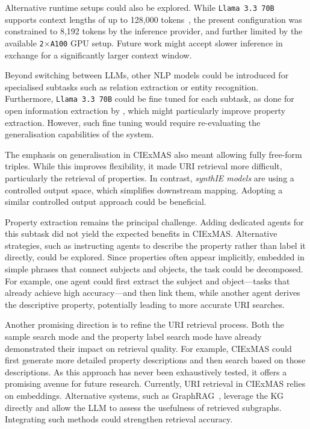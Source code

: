 \documentclass[a4paper,oneside,bibliography=totoc]{scrbook}
\begin{document}
Alternative runtime setups could also be explored. While \texttt{Llama 3.3 70B} supports context lengths of up to 128{,}000 tokens~\cite{Meta2024}, the present configuration was constrained to 8{,}192 tokens by the inference provider, and further limited by the available \texttt{2$\times$A100} GPU setup. Future work might accept slower inference in exchange for a significantly larger context window.

Beyond switching between \acp{LLM}, other \ac{NLP} models could be introduced for specialised subtasks such as relation extraction or entity recognition. Furthermore, \texttt{Llama 3.3 70B} could be fine tuned for each subtask, as done for open information extraction by \citet{Xue2024}, which might particularly improve property extraction. However, such fine tuning would require re-evaluating the generalisation capabilities of the system.

The emphasis on generalisation in CIExMAS also meant allowing fully free-form triples. While this improves flexibility, it made \ac{URI} retrieval more difficult, particularly the retrieval of properties. In contrast, \textit{synthIE models} are using a controlled output space, which simplifies downstream mapping. Adopting a similar controlled output approach could be beneficial.

Property extraction remains the principal challenge. Adding dedicated agents for this subtask did not yield the expected benefits in CIExMAS. Alternative strategies, such as instructing agents to describe the property rather than label it directly, could be explored. Since properties often appear implicitly, embedded in simple phrases that connect subjects and objects, the task could be decomposed. For example, one agent could first extract the subject and object—tasks that already achieve high accuracy—and then link them, while another agent derives the descriptive property, potentially leading to more accurate \ac{URI} searches.

Another promising direction is to refine the \ac{URI} retrieval process. Both the sample search mode and the property label search mode have already demonstrated their impact on retrieval quality. For example, CIExMAS could first generate more detailed property descriptions and then search based on those descriptions. As this approach has never been exhaustively tested, it offers a promising avenue for future research. Currently, \ac{URI} retrieval in CIExMAS relies on embeddings. Alternative systems, such as GraphRAG~\cite{Edge2025}, leverage the \ac{KG} directly and allow the \ac{LLM} to assess the usefulness of retrieved subgraphs. Integrating such methods could strengthen retrieval accuracy.
\end{document}
